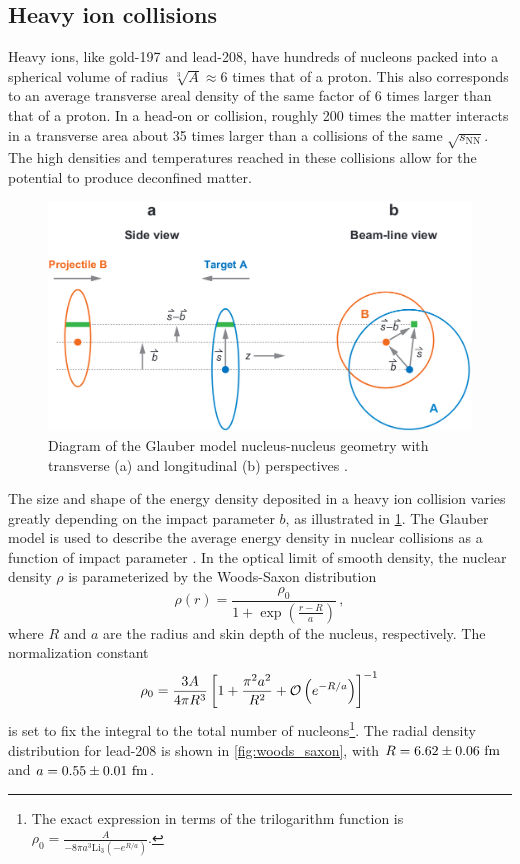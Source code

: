 \subsection{Heavy ion collisions}

Heavy ions, like gold-197 and lead-208, have hundreds of nucleons packed into a spherical volume of radius $\sqrt[3]{A} \approx 6$ times that of a proton.
This also corresponds to an average transverse areal density of the same factor of 6 times larger than that of a proton.
In a head-on \AuAu or \PbPb collision, roughly 200 times the matter interacts in a transverse area about 35 times larger than a \pp collisions of the same $\sqrt{s_\mathrm{NN}}$.
The high densities and temperatures reached in these collisions allow for the potential to produce deconfined \qgp matter.

\begin{figure}[t]
  \includegraphics{hi_collision_geo.png}
  \caption{Diagram of the Glauber model nucleus-nucleus geometry with transverse (a) and longitudinal (b) perspectives \cite{Miller:2007ri}.}
  \label{fig:hi_collision_geo}
\end{figure}

The size and shape of the energy density deposited in a heavy ion collision varies greatly depending on the impact parameter $b$, as illustrated in \cref{fig:hi_collision_geo}.
The Glauber model is used to describe the average energy density in nuclear collisions as a function of impact parameter \cite{Miller:2007ri}.
In the optical limit of smooth density, the nuclear density $\rho$ is parameterized by the Woods-Saxon distribution
\begin{equation}
\rho(r) = \frac{\rho_0}{1 + \exp\left( \frac{r-R}{a} \right)} \, ,
\end{equation}
where $R$ and $a$ are the radius and skin depth of the nucleus, respectively.
The normalization constant \[\rho_0 = \frac{3A}{4 \pi R^3} \left[1 + \frac{\pi^2 a^2}{R^2}  + \mathcal{O}\left( e^{-R/a} \right)\right]^{-1}\] is set to fix the integral to the total number of nucleons\footnote{The exact expression in terms of the trilogarithm function is \( \rho_0 = \frac{A}{-8\pi a^3 \mathrm{Li}_3\left( -e^{R/a} \right)} \).}.
The radial density distribution for lead-208 is shown in \cref{fig:woods_saxon}, with $R = 6.62 \pm 0.06~\mathrm{fm}$ and $a = 0.55 \pm 0.01~\mathrm{fm}$.


